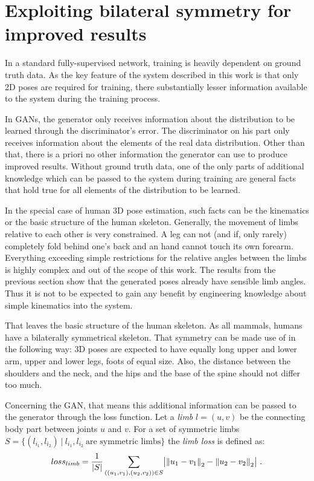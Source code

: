 \section{Exploiting bilateral symmetry for improved results}

In a standard fully-supervised network, training is heavily dependent on ground truth data.
As the key feature of the system described in this work is that only 2D poses are required for training, there substantially lesser information available to the system during the training process.

In GANs, the generator only receives information about the distribution to be learned through the discriminator's error.
The discriminator on his part only receives information about the elements of the real data distribution.
Other than that, there is a priori no other information the generator can use to produce improved results.
Without ground truth data, one of the only parts of additional knowledge which can be passed to the system during training are general facts that hold true for all elements of the distribution to be learned.

In the special case of human 3D pose estimation, such facts can be the kinematics or the basic structure of the human skeleton.
Generally, the movement of limbs relative to each other is very constrained.
A leg can not (and if, only rarely) completely fold behind one's back and an hand cannot touch its own forearm.
Everything exceeding simple restrictions for the relative angles between the limbs is highly complex and out of the scope of this work.
The results from the previous section show that the generated poses already have sensible limb angles.
Thus it is not to be expected to gain any benefit by engineering knowledge about simple kinematics into the system.

That leaves the basic structure of the human skeleton.
As all mammals, humans have a bilaterally symmetrical skeleton.
That symmetry can be made use of in the following way:
3D poses are expected to have equally long upper and lower arm, upper and lower legs, foots of equal size.
Also, the distance between the shoulders and the neck, and the hips and the base of the spine should not differ too much.

Concerning the GAN, that means this additional information can be passed to the generator through the loss function.
Let a \emph{limb} $l = (u, v)$ be the connecting body part between joints $u$ and $v$.
For a set of symmetric limbs $S = \{(l_{i_1}, l_{i_2})~|~ l_{i_1}, l_{i_2}\ \text{are symmetric limbs} \}$ the \emph{limb loss} is defined as:
\begin{equation}
loss_{limb} = \frac{1}{|S|}\sum_{((u_1, v_1), (u_2, v_2)) \in S} \bigl\lvert \norm{u_1 - v_1}_2 - \norm{u_2 - v_2}_2 \bigr\rvert \ .
\end{equation}

